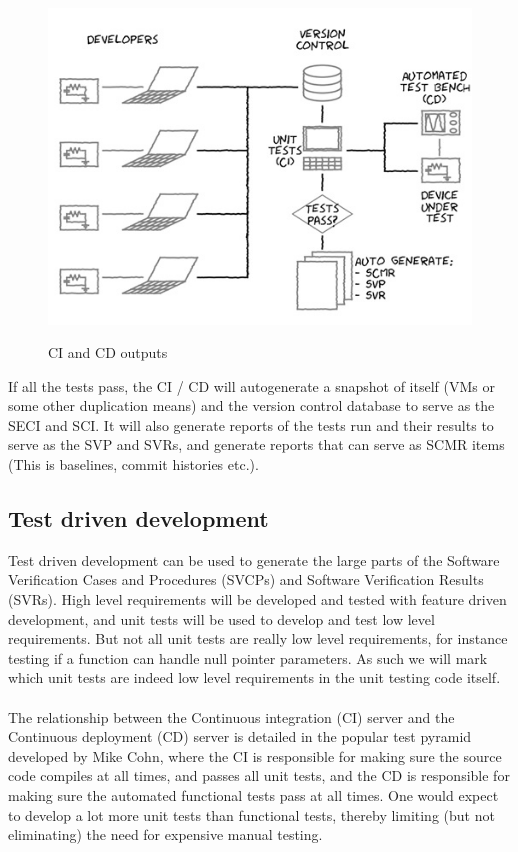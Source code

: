 \documentclass[a4paper]{article}
\begin{document}
\begin{center}
\begin{figure}[H]
\centering
\includegraphics[width=0.7\linewidth]{./pictures/CI-CD.jpg}\\
\caption{\label{fig:CI/CD Output}CI and CD outputs}
\end{figure}
\end{center}

If all the tests pass, the CI / CD will autogenerate a snapshot of itself (VMs or some other duplication means) and the version control database to serve as the SECI and SCI. It will also generate reports of the tests run and their results to serve as the SVP and SVRs, and generate reports that can serve as SCMR items (This is baselines, commit histories etc.).


\subsection{Test driven development}
Test driven development can be used to generate the large parts of the Software Verification Cases and Procedures (SVCPs) and Software Verification Results (SVRs). High level requirements will be developed and tested with feature driven development, and unit tests will be used to develop and test low level requirements. But not all unit tests are really low level requirements, for instance testing if a function can handle null pointer parameters. As such we will mark which unit tests are indeed low level requirements in the unit testing code itself.\\ 
\\
The relationship between the Continuous integration (CI) server and the Continuous deployment (CD) server is detailed in the popular test pyramid developed by Mike Cohn, where the CI is responsible for making sure the source code compiles at all times, and passes all unit tests, and the CD is responsible for making sure the automated functional tests pass at all times. One would expect to develop a lot more unit tests than functional tests, thereby limiting (but not eliminating) the need for expensive manual testing.\\
\newpage
\end{document}
